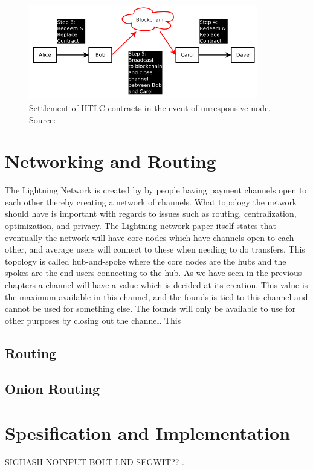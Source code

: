 \documentclass[informationsecurity]{gucmasterproject}
\begin{document}
\begin{figure}[h]
    \centering
    \includegraphics[width=10cm]{figs/htlc_bc.png}
    \caption{ Settlement of HTLC contracts in the event of unresponsive node. Source: \cite{poon2015bitcoin}}
    \label{fig:htlc_bc}
\end{figure}


\let\cleardoublepage\clearpage

\chapter{Networking and Routing}

The Lightning Network is created by by people having payment channels open to each other thereby creating a network of channels. What topology the network should have is important with regards to issues such as routing, centralization, optimization, and privacy. The Lightning network paper itself\cite{poon2015bitcoin} states that eventually the network will have core nodes which have channels open to each other, and average users will connect to these when needing to do transfers. This topology is called hub-and-spoke where the core nodes are the hubs and the spokes are the end users connecting to the hub. As we have seen in the previous chapters a channel will have a value which is decided at its creation. This value is the maximum available in this channel, and the founds is tied to this channel and cannot be used for something else. The founds will only be available to use for other purposes by closing out the channel. This 

\section{Routing}


\section{Onion Routing}


\chapter{Spesification and Implementation}
SIGHASH NOINPUT
BOLT 
LND
SEGWIT??
.






%

\end{document}
